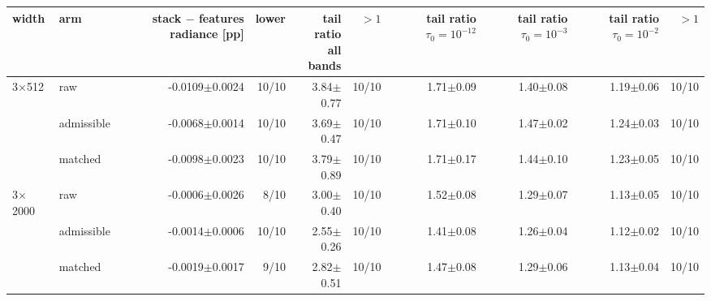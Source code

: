 \begin{tabular}{llrrrrrrrr}
\toprule
width & arm & \thead{stack $-$ features\\radiance [pp]} & lower & \thead{tail ratio\\all bands} & $>1$ & \thead{tail ratio\\$\tau_0=10^{-12}$} & \thead{tail ratio\\$\tau_0=10^{-3}$} & \thead{tail ratio\\$\tau_0=10^{-2}$} & $>1$ \\
\midrule
3$\times$512 & raw & -0.0109$\pm$0.0024 & 10/10 & 3.84$\pm$0.77 & 10/10 & 1.71$\pm$0.09 & 1.40$\pm$0.08 & 1.19$\pm$0.06 & 10/10 \\
 & admissible & -0.0068$\pm$0.0014 & 10/10 & 3.69$\pm$0.47 & 10/10 & 1.71$\pm$0.10 & 1.47$\pm$0.02 & 1.24$\pm$0.03 & 10/10 \\
 & matched & -0.0098$\pm$0.0023 & 10/10 & 3.79$\pm$0.89 & 10/10 & 1.71$\pm$0.17 & 1.44$\pm$0.10 & 1.23$\pm$0.05 & 10/10 \\
3$\times$2000 & raw & -0.0006$\pm$0.0026 & 8/10 & 3.00$\pm$0.40 & 10/10 & 1.52$\pm$0.08 & 1.29$\pm$0.07 & 1.13$\pm$0.05 & 10/10 \\
 & admissible & -0.0014$\pm$0.0006 & 10/10 & 2.55$\pm$0.26 & 10/10 & 1.41$\pm$0.08 & 1.26$\pm$0.04 & 1.12$\pm$0.02 & 10/10 \\
 & matched & -0.0019$\pm$0.0017 & 9/10 & 2.82$\pm$0.51 & 10/10 & 1.47$\pm$0.08 & 1.29$\pm$0.06 & 1.13$\pm$0.04 & 10/10 \\
\bottomrule
\end{tabular}
